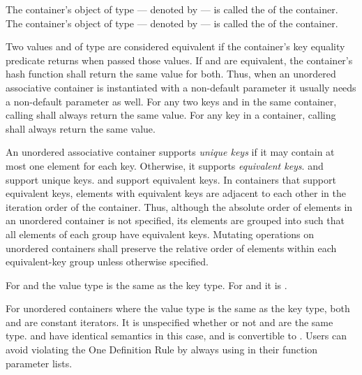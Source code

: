 \pnum
{}%
%
The container's object of type  --- denoted by
 --- is called the  of the
container. The container's object of type  ---
denoted by  --- is called the
 of the container.

\pnum
{}%
Two values  and  of type  are
considered equivalent if the container's
key equality predicate returns
 when passed those values.  If  and
 are equivalent, the container's hash function shall
return the same value for both.
\enternote Thus, when an unordered associative container is instantiated with
a non-default  parameter it usually needs a non-default 
parameter as well. \exitnote
For any two keys  and  in the same container,
calling  shall always return the same value.
For any key  in a container, calling 
shall always return the same value.

\pnum
{}%
%
An unordered associative container supports \textit{unique keys} if it
may contain at most one element for each key.  Otherwise, it supports
\textit{equivalent keys}.   and 
support unique keys.  and 
support equivalent keys.  In containers that support equivalent keys,
elements with equivalent keys are adjacent to each other
in the iteration order of the container. Thus, although the absolute order
of elements in an unordered container is not specified, its elements are
grouped into  such that all elements of each
group have equivalent keys. Mutating operations on unordered containers shall
preserve the relative order of elements within each equivalent-key group
unless otherwise specified.

\pnum
For  and  the value type is
the same as the key type.  For  and
 it is .

\pnum
For unordered containers where the value type is the same as the key
type, both  and  are constant
iterators. It is unspecified whether or not  and
 are the same type.
\enternote {} and  have identical
semantics in this case, and  is convertible to
. Users can avoid violating the One Definition Rule
by always using  in their function parameter lists.
\exitnote

